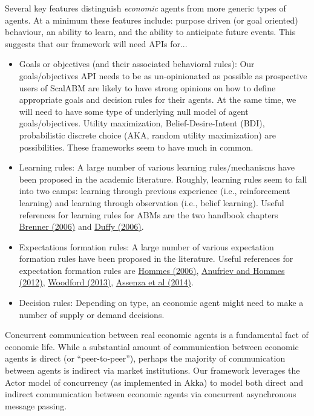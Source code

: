 \documentclass[11pt]{amsart}
\begin{document}
Several key features distinguish \textit{economic} agents from more generic types of agents. At a minimum these features include: purpose driven (or goal oriented) behaviour, an ability to learn, and the ability to anticipate future events. This suggests that our framework will need APIs for...
\begin{itemize}
    \item Goals or objectives (and their associated behavioral rules): Our goals/objectives API needs to be as un-opinionated as possible as prospective users of ScalABM are likely to have strong opinions on how to define appropriate goals and decision rules for their agents. At the same time, we will need to have some type of underlying null model of agent goals/objectives. Utility maximization, Belief-Desire-Intent (BDI), probabilistic discrete choice (AKA, random utility maximization) are possibilities. These frameworks seem to have much in common.  
    \item Learning rules: A large number of various learning rules/mechanisms have been proposed in the academic literature. Roughly, learning rules seem to fall into two camps: learning through previous experience (i.e., reinforcement learning) and learning through observation (i.e., belief learning). Useful references for learning rules for ABMs are the two handbook chapters \href{http://web.uvic.ca/~mingkang/econ353/project/Brenner.pdf}{Brenner (2006)} and \href{http://www.socsci.uci.edu/~duffy/papers/duffy2006.pdf}{Duffy (2006)}.
    \item Expectations formation rules: A large number of various expectation formation rules have been proposed in the literature. Useful references for expectation formation rules are \href{http://feb.kuleuven.be/fac/Slides_Degrauwe/HomHBchapter23.pdf}{Hommes (2006)}, \href{http://econ.columbia.edu/files/econ/content/hommes_background_material_2.pdf}{Anufriev and Hommes (2012)}, \href{http://www.columbia.edu/~mw2230/AREcon.pdf}{Woodford (2013)}, \href{http://www.emeraldinsight.com/doi/pdfplus/10.1108/S0193-230620140000017002}{Assenza et al (2014)}.
    \item Decision rules: Depending on type, an economic agent might need to make a number of supply or demand decisions.
\end{itemize}

Concurrent communication between real economic agents is a fundamental fact of economic life. While a substantial amount of communication between economic agents is direct (or ``peer-to-peer''), perhaps the majority of communication between agents is indirect via market institutions. Our framework leverages the Actor model of concurrency (as implemented in Akka) to model both direct and indirect communication between economic agents via concurrent asynchronous message passing.
\end{document}
